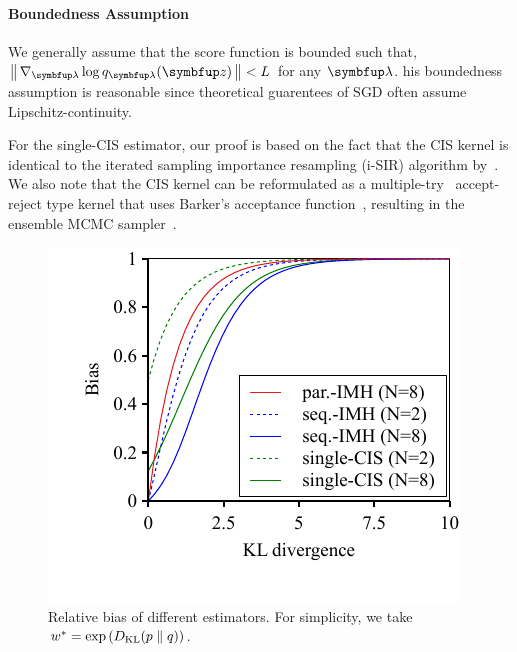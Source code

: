 \vspace{-0.05in}
\paragraph{Boundedness Assumption}
We generally assume that the score function is bounded such that, \(\norm{\nabla_{\vlambda} \log q_{\vlambda}(\vz)} < L\) for any \(\vlambda\).
his boundedness assumption is reasonable since theoretical guarentees of SGD often assume Lipschitz-continuity.%

%

%

%
For the single-CIS estimator, our proof is based on the fact that the CIS kernel is identical to the iterated sampling importance resampling (i-SIR) algorithm by~\citet{andrieu_uniform_2018}.
We also note that the CIS kernel can be reformulated as a multiple-try~\citet[Table 12]{martino_review_2018a} accept-reject type kernel that uses Barker's acceptance function~\citep{barker_monte_1965}, resulting in the ensemble MCMC sampler~\citet{austad_parallel_2007, neal_mcmc_2011a}.
%

%
\begin{figure}[H]
\vspace{-0.05in}
  \centering
  \includegraphics[scale=0.8]{figures/bias_01.pdf}
  \vspace{-0.3in}
  \caption{Relative bias of different estimators.
  For simplicity, we take \(w^* = \exp\left( D_{\mathrm{KL}}(p\parallel q) \right)\).}\label{fig:bias}
\vspace{-0.05in}
\end{figure}
%
\vspace{-0.05in}
